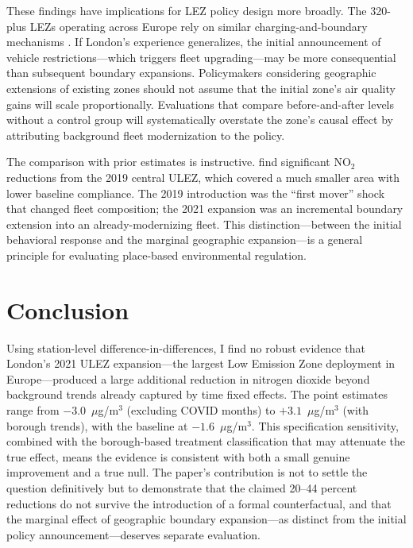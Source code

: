 \documentclass[12pt]{article}
\begin{document}
These findings have implications for LEZ policy design more broadly. The 320-plus LEZs operating across Europe rely on similar charging-and-boundary mechanisms \citep{holman2015, pestel2017}. If London's experience generalizes, the initial announcement of vehicle restrictions---which triggers fleet upgrading---may be more consequential than subsequent boundary expansions. Policymakers considering geographic extensions of existing zones should not assume that the initial zone's air quality gains will scale proportionally. Evaluations that compare before-and-after levels without a control group will systematically overstate the zone's causal effect by attributing background fleet modernization to the policy.

The comparison with prior estimates is instructive. \citet{beshirFichera2025} find significant NO$_2$ reductions from the 2019 central ULEZ, which covered a much smaller area with lower baseline compliance. The 2019 introduction was the ``first mover'' shock that changed fleet composition; the 2021 expansion was an incremental boundary extension into an already-modernizing fleet. This distinction---between the initial behavioral response and the marginal geographic expansion---is a general principle for evaluating place-based environmental regulation.


\section{Conclusion}

Using station-level difference-in-differences, I find no robust evidence that London's 2021 ULEZ expansion---the largest Low Emission Zone deployment in Europe---produced a large additional reduction in nitrogen dioxide beyond background trends already captured by time fixed effects. The point estimates range from $-3.0$~$\mu$g/m$^3$ (excluding COVID months) to $+3.1$~$\mu$g/m$^3$ (with borough trends), with the baseline at $-1.6$~$\mu$g/m$^3$. This specification sensitivity, combined with the borough-based treatment classification that may attenuate the true effect, means the evidence is consistent with both a small genuine improvement and a true null. The paper's contribution is not to settle the question definitively but to demonstrate that the claimed 20--44 percent reductions do not survive the introduction of a formal counterfactual, and that the marginal effect of geographic boundary expansion---as distinct from the initial policy announcement---deserves separate evaluation.
\end{document}
